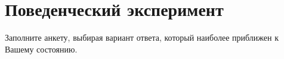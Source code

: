\documentclass{survey}
\begin{document}
\section*{\huge{Поведенческий эксперимент}}

\begin{flushleft}
Заполните анкету, выбирая вариант ответа, который наиболее приближен к Вашему состоянию.
\end{flushleft}
\end{document}
